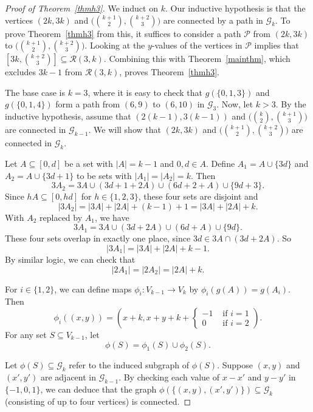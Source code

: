 \documentclass{daj}
\theoremstyle{definition}
\theoremstyle{remark}
\numberwithin{equation}{section}
\numberwithin{theorem}{section}
\newcommand{\calg}{\mathcal{G}}
\newcommand{\calr}{\mathcal{R}}
\begin{document}
\begin{proof}[Proof of Theorem~\ref{thmh3}]
    We induct on $k$. Our inductive hypothesis is that the vertices $(2k,3k)$ and $\big(\binom{k+1}{2},\binom{k+2}{3}\big)$ are connected by a path in $\calg_k$. To prove Theorem~\ref{thmh3} from this, it suffices to consider a path $\mathcal{P}$ from $(2k,3k)$ to $\big(\binom{k+1}{2},\binom{k+2}{3}\big)$. Looking at the $y$-values of the vertices in $\mathcal{P}$ implies that $\left[3k,\binom{k+2}{3}\right] \subseteq \mathcal{R}(3,k)$. Combining this with Theorem~\ref{mainthm}, which excludes $3k-1$ from $\calr(3,k)$, proves Theorem~\ref{thmh3}.

    The base case is $k=3$, where it is easy to check that $g(\{0,1,3\})$ and $g(\{0,1,4\})$ form a path from $(6,9)$ to $(6,10)$ in $\calg_3$. Now, let $k > 3$. By the inductive hypothesis, assume that $(2(k-1),3(k-1))$ and $\big(\binom{k}{2},\binom{k+1}{3}\big)$ are connected in $\calg_{k-1}$. We will show that $(2k,3k)$ and $\big(\binom{k+1}{2},\binom{k+2}{3}\big)$ are connected in $\calg_k$.

    Let $A \subseteq [0,d]$ be a set with $|A| = k-1$ and $0,d \in A$. Define $A_1 = A \cup \{3d\}$ and $A_2 = A \cup \{3d+1\}$ to be sets with $|A_1| = |A_2| = k$. Then \begin{equation}\label{eqanalogy}3A_2 = 3A\cup (3d+1+2A) \cup (6d+2+A) \cup \{9d+3\}.\end{equation} Since $hA \subseteq [0,hd]$ for $h \in \{1,2,3\}$, these four sets are disjoint and \[|3A_2| = |3A|+|2A|+(k-1)+1 = |3A|+|2A|+k.\] With $A_2$ replaced by $A_1$, we have \[3A_1 = 3A\cup (3d+2A) \cup (6d+A) \cup \{9d\}.\] These four sets overlap in exactly one place, since $3d \in 3A\cap (3d+2A)$. So \[|3A_1| = |3A|+|2A|+k-1.\] By similar logic, we can check that \[|2A_1|=|2A_2| = |2A|+k.\] 
    
    For $i \in \{1,2\}$, we can define maps $\phi_i:V_{k-1} \to V_k$ by $\phi_i(g(A)) = g(A_i)$. Then \[\phi_i((x,y)) = \left(x+k,x+y+k+\begin{cases}
        -1 & \text{ if } i = 1 \\
        0 &\text{ if } i = 2 
    \end{cases}\right).\]
    For any set $S \subseteq V_{k-1}$, let \[\phi(S) = \phi_1(S) \cup \phi_2(S).\] 
    
    Let $\phi(S) \subseteq \calg_k$ refer to the induced subgraph of $\phi(S)$. Suppose $(x,y)$ and $(x',y')$ are adjacent in $\calg_{k-1}$. By checking each value of $x-x'$ and $y-y'$ in $\{-1,0,1\}$, we can deduce that the graph $\phi(\{(x,y),(x',y')\}) \subseteq \calg_k$ (consisting of up to four vertices) is connected. 
    

\end{proof}
\end{document}
